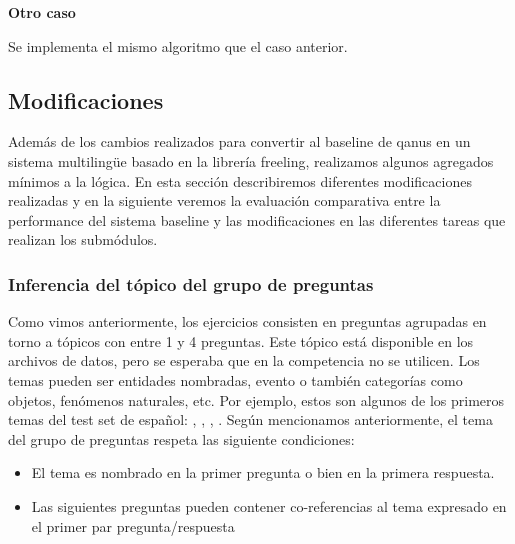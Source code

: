 \textbf{Otro caso} \newline

Se implementa el mismo algoritmo que el caso anterior. \newline


\subsection{Modificaciones}
\label{subsec:modificaciones}

Además de los cambios realizados para convertir al baseline de qanus en un sistema multilingüe basado en la librería freeling, realizamos algunos agregados mínimos a la lógica. En esta sección describiremos diferentes modificaciones realizadas y en la siguiente veremos la evaluación comparativa entre la performance del sistema baseline y las modificaciones en las diferentes tareas que realizan los submódulos.

\subsubsection{Inferencia del tópico del grupo de preguntas}
\label{subsubsec:entidad-de-grupo}

Como vimos anteriormente, los ejercicios consisten en preguntas agrupadas en torno a tópicos con entre 1 y 4 preguntas. Este tópico está disponible en los archivos de datos, pero se esperaba que en la competencia no se utilicen. Los temas pueden ser entidades nombradas, evento o también categorías como objetos, fenómenos naturales, etc. Por ejemplo, estos son algunos de los primeros temas del test set de español: , , , . Según mencionamos anteriormente, el tema del grupo de preguntas respeta las siguiente condiciones:

\begin{itemize}
\item El tema es nombrado en la primer pregunta o bien en la primera respuesta.
\item Las siguientes preguntas pueden contener co-referencias al tema expresado en el primer par pregunta/respuesta
\end{itemize}

